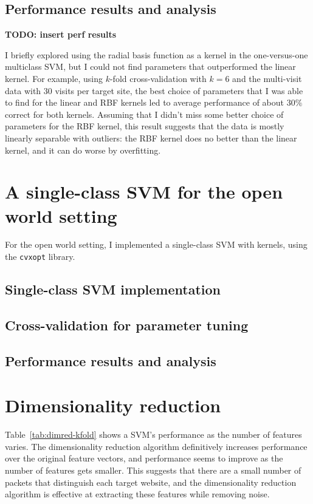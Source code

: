 \documentclass[10pt, twocolumn]{article}
\begin{document}
\subsection{Performance results and analysis}

\textbf{TODO: insert perf results}

I briefly explored using the radial basis function as a kernel in the one-versus-one multiclass 
SVM, but I could not find parameters that outperformed the linear kernel. For example, using $k$-fold 
cross-validation with $k=6$ and the multi-visit data with 30 visits per target site, the best choice of 
parameters that I was able to find for the linear and RBF kernels led to average performance of about 
$30\%$ correct for both kernels. Assuming that I didn't miss some better choice of parameters for the 
RBF kernel, this result suggests that the data is mostly linearly separable with outliers: the RBF kernel 
does no better than the linear kernel, and it can do worse by overfitting.

\section{A single-class SVM for the open world setting}

For the open world setting, I implemented a single-class SVM with kernels, using the 
\texttt{cvxopt} library.

\subsection{Single-class SVM implementation}

\subsection{Cross-validation for parameter tuning}

\subsection{Performance results and analysis}

\section{Dimensionality reduction}
\label{sec:dimred}

Table~\ref{tab:dimred-kfold} shows a SVM's performance as the number of features varies. The dimensionality 
reduction algorithm definitively increases performance over the original feature vectors, and performance 
seems to improve as the number of features gets smaller. This suggests that there are a small number of 
packets that distinguish each target website, and the dimensionality reduction algorithm is effective at 
extracting these features while removing noise.
\end{document}
